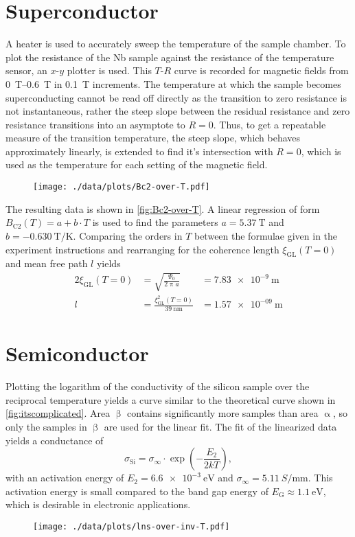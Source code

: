 \section{Superconductor}
A heater is used to accurately sweep the temperature of the sample chamber.
To plot the resistance of the Nb sample against the resistance of the temperature sensor, an $x$-$y$ plotter is used.
This $T$-$R$ curve is recorded for magnetic fields from \SIrange{0}{0.6}{\tesla} in \SI{0.1}{\tesla} increments.
The temperature at which the sample becomes superconducting cannot be read off directly as the transition to zero resistance is not instantaneous, rather the steep slope between the residual resistance and zero resistance transitions into an asymptote to $R = 0$.
Thus, to get a repeatable measure of the transition temperature, the steep slope, which behaves approximately linearly, is extended to find it's intersection with $R = 0$, which is used as the temperature for each setting of the magnetic field.
\begin{figure}
	\centering
	\texttt{[image: ./data/plots/Bc2-over-T.pdf]}
	\label{fig:Bc2-over-T}
\end{figure}
The resulting data is shown in \autoref{fig:Bc2-over-T}.
A linear regression of form $B_\text{C2}(T) = a + b \cdot T$ is used to find the parameters $a = \SI{5.37}{\tesla}$ and $b = \SI{-0.630}{\tesla\per\kelvin}$.
Comparing the orders in $T$ between the formulae given in the experiment instructions and rearranging for the coherence length $\xi_\text{GL}(T = 0)$ and mean free path $l$ yields
\begin{alignat*}{2}
	\xi_\text{GL}(T = 0) &= \sqrt{\frac{\Psi_0}{2 \uppi a}} &= \SI{7.83e-9}{\meter}\\
	l &= \frac{\xi^2_\text{GL}(T = 0)}{\SI{39}{\nano\meter}} &= \SI{1.57e-09}{\meter}
\end{alignat*}

\section{Semiconductor}
Plotting the logarithm of the conductivity of the silicon sample over the reciprocal temperature yields a curve similar to the theoretical curve shown in \autoref{fig:itscomplicated}.
Area $\upbeta$ contains significantly more samples than area $\upalpha$, so only the samples in $\upbeta$ are used for the linear fit.
The fit of the linearized data yields a conductance of
\begin{equation*}
	\sigma_\text{Si} = \sigma_\infty \cdot \exp\left(- \frac{E_2}{2 k T}\right),
\end{equation*}
with an activation energy of $E_2 = \SI{6.6e-3}{\eV}$ and $\sigma_\infty = \SI{5.11}{S\per\milli\meter}$.
This activation energy is small compared to the band gap energy of $E_\text{G} \approx \SI{1.1}{\eV}$, which is desirable in electronic applications.

\begin{figure}
	\centering
	\texttt{[image: ./data/plots/lns-over-inv-T.pdf]}
	\label{fig:lns-over-inv-T}
\end{figure}
